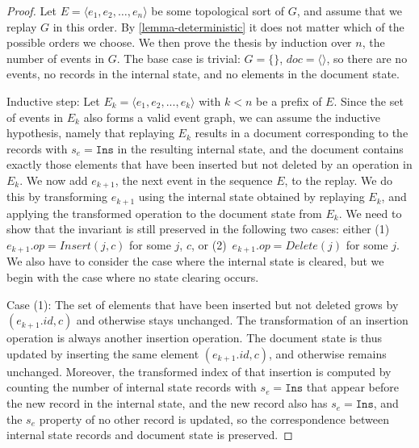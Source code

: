 \documentclass[sigplan,10pt]{acmart}
\begin{document}
\begin{proof}
  Let $E = \langle e_1, e_2, \dots, e_n \rangle$ be some topological sort of $G$, and assume that we replay $G$ in this order.
  By \autoref{lemma-deterministic} it does not matter which of the possible orders we choose.
  We then prove the thesis by induction over $n$, the number of events in $G$.
  The base case is trivial: $G=\{\}$, $\mathit{doc}=\langle \rangle$, so there are no events, no records in the internal state, and no elements in the document state.

  Inductive step: Let $E_k = \langle e_1, e_2, ..., e_k \rangle$ with $k<n$ be a prefix of $E$.
  Since the set of events in $E_k$ also forms a valid event graph, we can assume the inductive hypothesis, namely that replaying $E_k$ results in a document corresponding to the records with $s_e = \texttt{Ins}$ in the resulting internal state, and the document contains exactly those elements that have been inserted but not deleted by an operation in $E_k$.
  We now add $e_{k+1}$, the next event in the sequence $E$, to the replay.
  We do this by transforming $e_{k+1}$ using the internal state obtained by replaying $E_k$, and applying the transformed operation to the document state from $E_k$.
  We need to show that the invariant is still preserved in the following two cases: either (1)~$e_{k+1}.\mathit{op} = \mathit{Insert}(j,c)$ for some $j$, $c$, or (2)~$e_{k+1}.\mathit{op} = \mathit{Delete}(j)$ for some $j$.
  We also have to consider the case where the internal state is cleared, but we begin with the case where no state clearing occurs.

  Case (1): The set of elements that have been inserted but not deleted grows by $(e_{k+1}.\mathit{id}, c)$ and otherwise stays unchanged.
  The transformation of an insertion operation is always another insertion operation.
  The document state is thus updated by inserting the same element $(e_{k+1}.\mathit{id}, c)$, and otherwise remains unchanged.
  Moreover, the transformed index of that insertion is computed by counting the number of internal state records with $s_e = \texttt{Ins}$ that appear before the new record in the internal state, and the new record also has $s_e = \texttt{Ins}$, and the $s_e$ property of no other record is updated, so the correspondence between internal state records and document state is preserved.


\end{proof}
\end{document}
